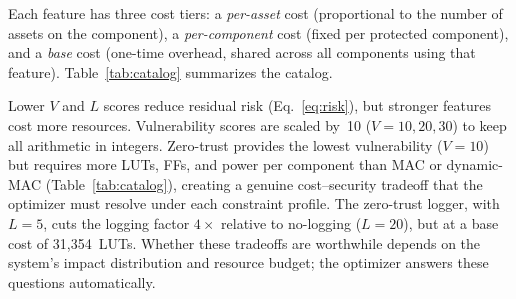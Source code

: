 \documentclass[conference]{IEEEtran}
\begin{document}
Each feature has three cost tiers:
a \emph{per-asset} cost (proportional to the number of assets on the
component), a \emph{per-component} cost (fixed per protected component),
and a \emph{base} cost (one-time overhead, shared across all components
using that feature). Table~\ref{tab:catalog} summarizes the catalog.

\begin{table}[t]
\caption{Feature-cost catalog (Vivado synthesis, xc7z020 @ 125\,MHz)}
\label{tab:catalog}
\centering
{}
\end{table}

Lower $V$ and $L$ scores reduce residual risk (Eq.~\ref{eq:risk}), but
stronger features cost more resources. Vulnerability scores are scaled
by~10 ($V\!=\!10,20,30$) to keep all arithmetic in integers.
Zero-trust provides the lowest vulnerability ($V\!=\!10$) but requires
more LUTs, FFs, and power per component than MAC or dynamic-MAC
(Table~\ref{tab:catalog}), creating a genuine cost--security tradeoff
that the optimizer must resolve under each constraint profile. The
zero-trust logger, with $L=5$, cuts the logging factor $4\times$
relative to no-logging ($L=20$), but at a base cost of 31{,}354~LUTs.
Whether these tradeoffs are worthwhile depends on the system's impact
distribution and resource budget; the optimizer answers these
questions automatically.
\end{document}
